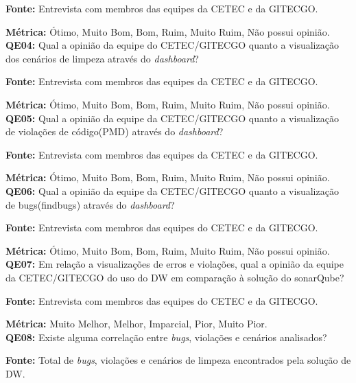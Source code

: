 \textbf{Fonte:} Entrevista com membros das equipes da CETEC e da GITECGO.

\textbf{Métrica:} Ótimo, Muito Bom, Bom, Ruim, Muito Ruim, Não possui opinião.\\



\textbf{QE04: } Qual a opinião da equipe do CETEC/GITECGO quanto a visualização dos cenários  de limpeza através do \textit{dashboard}?

\textbf{Fonte:} Entrevista com membros das equipes da CETEC e da GITECGO.

\textbf{Métrica:} Ótimo, Muito Bom, Bom, Ruim, Muito Ruim, Não possui opinião.\\



\textbf{QE05: } Qual a opinião da equipe da CETEC/GITECGO quanto a visualização de violações de código(PMD) através do \textit{dashboard}?

\textbf{Fonte:} Entrevista com membros das equipes da CETEC e da GITECGO.

\textbf{Métrica:} Ótimo, Muito Bom, Bom, Ruim, Muito Ruim, Não possui opinião.\\



\textbf{QE06: } Qual a opinião da equipe da CETEC/GITECGO quanto a visualização de bugs(findbugs) através do \textit{dashboard}?

\textbf{Fonte:} Entrevista com membros das equipes do CETEC e da GITECGO.

\textbf{Métrica:} Ótimo, Muito Bom, Bom, Ruim, Muito Ruim, Não possui opinião.\\




\textbf{QE07: } Em relação a visualizações de erros e violações, qual a opinião da equipe da CETEC/GITECGO do uso do DW em comparação à solução do sonarQube?

\textbf{Fonte:} Entrevista com membros das equipes do CETEC e da GITECGO.

\textbf{Métrica:} Muito Melhor, Melhor, Imparcial, Pior, Muito Pior.\\



\textbf{QE08: } Existe alguma correlação entre \textit{bugs}, violações e cenários analisados? 

\textbf{Fonte:} Total de \textit{bugs}, violações e cenários de limpeza encontrados pela solução de DW.


